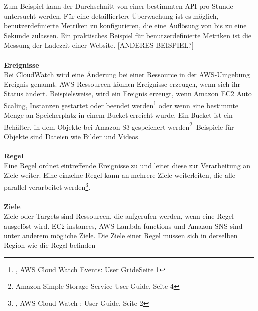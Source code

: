 Zum Beispiel kann der Durchschnitt von einer bestimmten API pro Stunde untersucht werden.
Für eine detailliertere Überwachung ist es möglich, benutzerdefinierte Metriken zu konfigurieren, die eine Auflösung von bis zu eine Sekunde zulassen. Ein praktisches Beispiel für benutzerdefinierte Metriken ist die Messung der Ladezeit einer Website.
[ANDERES BEISPIEL?]
\\\\
\textbf{Ereignisse} 
\\
Bei CloudWatch wird eine Änderung bei einer Ressource in der AWS-Umgebung Ereignis genannt. 
AWS-Ressourcen können Ereignisse erzeugen, wenn sich ihr Status ändert.
Beispielsweise, wird ein Ereignis erzeugt, wenn Amazon EC2 Auto Scaling, Instanzen gestartet oder beendet werden\footnote{\cite{AMZ13}, AWS Cloud Watch Events: User GuideSeite 1} oder wenn eine bestimmte Menge an Speicherplatz in einem Bucket erreicht wurde. Ein Bucket ist ein Behälter, in dem Objekte bei Amazon S3 gespeichert werden\footnote{\cite{AMZ18}Amazon Simple Storage Service User Guide, Seite 4}. Beispiele für Objekte sind Dateien wie Bilder und Videos. 
\\\\
\textbf{Regel} \\
Eine Regel ordnet eintreffende Ereignisse zu und leitet diese zur Verarbeitung an Ziele weiter.
Eine einzelne Regel kann an mehrere Ziele weiterleiten, die alle parallel verarbeitet werden\footnote{\cite{AMZ13}, AWS Cloud Watch : User Guide, Seite 2}.
\\\\
\textbf{Ziele} \\
Ziele oder Targets sind Ressourcen, die aufgerufen werden, wenn eine Regel ausgelöst wird.
EC2 instances, AWS Lambda functions und Amazon SNS sind unter anderem mögliche Ziele.
Die Ziele einer Regel müssen sich in derselben Region wie die Regel befinden
